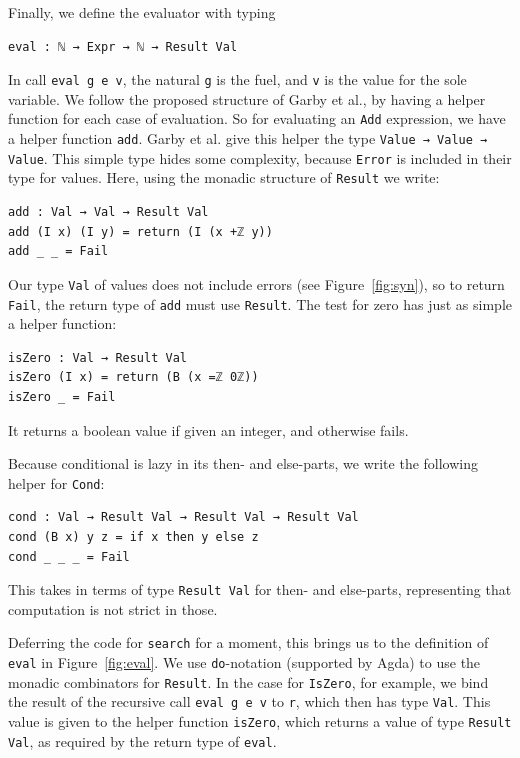 \documentclass[acmsmall,screen,review]{acmart}
\begin{document}
Finally, we define the evaluator with typing

\begin{verbatim}
eval : ℕ → Expr → ℕ → Result Val
\end{verbatim}

\noindent In call \verb|eval g e v|, the natural \verb|g| is the fuel, and
\verb|v| is the value for the sole variable.  We follow the proposed
structure of Garby et al., by having a helper function for each case
of evaluation.  So for evaluating an \verb|Add| expression, we have a
helper function \verb|add|.  Garby et al. give this helper the type
\verb|Value → Value → Value|.  This simple type hides some complexity,
because \verb|Error| is included in their type for values.  Here,
using the monadic structure of \verb|Result| we write:

\begin{verbatim}
add : Val → Val → Result Val
add (I x) (I y) = return (I (x +ℤ y))
add _ _ = Fail
\end{verbatim}

\noindent Our type \verb|Val| of values does not include errors (see
Figure~\ref{fig:syn}), so to return \verb|Fail|, the return type of
\verb|add| must use \verb|Result|.  The test for zero has just as
simple a helper function:

\begin{verbatim}
isZero : Val → Result Val
isZero (I x) = return (B (x =ℤ 0ℤ))
isZero _ = Fail
\end{verbatim}

\noindent It returns a boolean value if given an integer, and otherwise fails.


Because conditional is lazy in its then- and else-parts, we write the
following helper for \verb|Cond|:

\begin{verbatim}
cond : Val → Result Val → Result Val → Result Val
cond (B x) y z = if x then y else z
cond _ _ _ = Fail
\end{verbatim}

\noindent This takes in terms of type \verb|Result Val| for then- and else-parts, representing that computation
is not strict in those.

Deferring the code for \verb|search| for a moment, this brings us to the definition of \verb|eval| in Figure~\ref{fig:eval}.
We use \verb|do|-notation (supported by Agda) to use the monadic combinators for \verb|Result|.  In the case
for \verb|IsZero|, for example, we bind the result of the recursive call \verb|eval g e v| to \verb|r|, which
then has type \verb|Val|.  This value is given to the helper function \verb|isZero|, which returns a value
of type \verb|Result Val|, as required by the return type of \verb|eval|.
\end{document}
